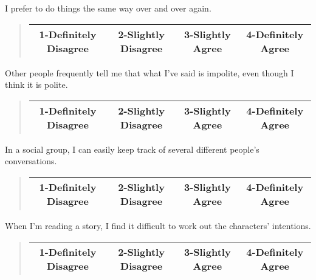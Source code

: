 \documentclass[11pt]{article}
\begin{document}
\begin{tcolorbox}
I prefer to do things the same way over and over again. \\
\begin{quote}
\begin{center}
	\begin{tabular}{|c|c|c|c|}
\hline
		1-Definitely Disagree & 2-Slightly Disagree & 3-Slightly Agree & 4-Definitely Agree\\ \hline
	\end{tabular}
\end{center}
\end{quote}
\end{tcolorbox}
\begin{tcolorbox}
Other people frequently tell me that what I've said is impolite, even though I think it is polite. \\
\begin{quote}
\begin{center}
	\begin{tabular}{|c|c|c|c|}
\hline
		1-Definitely Disagree & 2-Slightly Disagree & 3-Slightly Agree & 4-Definitely Agree\\ \hline
	\end{tabular}
\end{center}
\end{quote}
\end{tcolorbox}
\begin{tcolorbox}
In a social group, I can easily keep track of several different people's conversations.  \\
\begin{quote}
\begin{center}
	\begin{tabular}{|c|c|c|c|}
\hline
		1-Definitely Disagree & 2-Slightly Disagree & 3-Slightly Agree & 4-Definitely Agree\\ \hline
	\end{tabular}
\end{center}
\end{quote}
\end{tcolorbox}
\begin{tcolorbox}
When I'm reading a story, I find it difficult to work out the characters' intentions.  \\
\begin{quote}
\begin{center}
	\begin{tabular}{|c|c|c|c|}
\hline
		1-Definitely Disagree & 2-Slightly Disagree & 3-Slightly Agree & 4-Definitely Agree\\ \hline
	\end{tabular}
\end{center}
\end{quote}
\end{tcolorbox}
\end{document}
